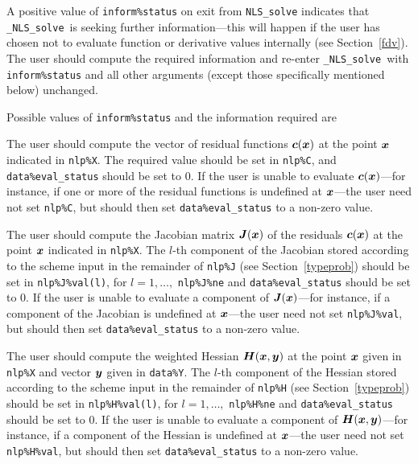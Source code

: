 \documentclass{galahad}
\newcommand{\packagename}{NLS}
\newcommand{\fullpackagename}{\libraryname\_\packagename}
\newcommand{\solver}{{\tt \fullpackagename\_solve}}
\begin{document}
A positive value of {\tt inform\%status} on exit from
{\tt \packagename\_solve}
indicates that
\solver\ is seeking further information---this will happen
if the user has chosen not to evaluate function or
derivative values internally (see Section~\ref{fdv}).
The user should compute the required information and re-enter \solver\
with {\tt inform\%status} and all other arguments (except those specifically
mentioned below) unchanged.

Possible values of {\tt inform\%status} and the information required are
\begin{description}
 The user should compute the vector of residual functions
     ${\bm{c}}({\bm{x}})$ at the point ${\bm{x}}$ indicated in {\tt nlp\%X}.
     The required value should be set in {\tt nlp\%C}, and
     {\tt data\%eval\_status} should be set to 0. If the user is
     unable to evaluate ${\bm{c}}({\bm{x}})$---for instance, if one or more of the
     residual functions is undefined at ${\bm{x}}$---the user need not set
     {\tt nlp\%C}, but should then set {\tt data\%eval\_status}
     to a non-zero value.

 The user should compute the Jacobian matrix ${\bm{J}}({\bm{x}})$ of the
     residuals ${\bm{c}}({\bm{x}})$ at the point ${\bm{x}}$ indicated in {\tt nlp\%X}.
     The $l$-th component of the Jacobian stored according to the
     scheme input in the remainder of {\tt nlp\%J} (see Section~\ref{typeprob})
     should be set in {\tt nlp\%J\%val(l)}, for $l = 1, \ldots,$
     {\tt  nlp\%J\%ne} and {\tt data\%eval\_status} should be set to 0.
     If the user is unable to  evaluate a component of ${\bm{J}}({\bm{x}})$---for
     instance, if a component of the Jacobian is
     undefined at ${\bm{x}}$---the user need not set {\tt nlp\%J\%val}, but
     should then set {\tt data\%eval\_status} to a non-zero value.

 The user should compute the weighted Hessian ${\bm{H}}({\bm{x}},{\bm{y}})$
     at the point ${\bm{x}}$ given in {\tt nlp\%X} and vector ${\bm{y}}$ given in
     {\tt data\%Y}. The $l$-th component of the Hessian stored
     according to the scheme input in the remainder of {\tt nlp\%H}
     (see Section~\ref{typeprob}) should be set in {\tt nlp\%H\%val(l)},
     for $l = 1, \ldots,$ {\tt  nlp\%H\%ne} and
     {\tt data\%eval\_status} should be set to 0. If the user is
     unable to evaluate a component of ${\bm{H}}({\bm{x}},{\bm{y}})$---for instance,
     if a component of the Hessian is
     undefined at ${\bm{x}}$---the user need not set {\tt nlp\%H\%val}, but
     should then set {\tt data\%eval\_status} to a non-zero value.


\end{description}
\end{document}
